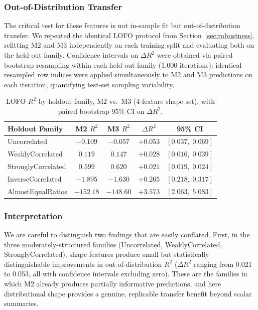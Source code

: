\documentclass[11pt,a4paper]{article}
\begin{document}
\subsubsection*{Out-of-Distribution Transfer}
The critical test for these features is not in-sample fit but out-of-distribution transfer. We repeated the identical LOFO protocol from Section~\ref{sec:robustness}, refitting M2 and M3 independently on each training split and evaluating both on the held-out family. Confidence intervals on $\Delta R^2$ were obtained via paired bootstrap resampling within each held-out family (1,000 iterations): identical resampled row indices were applied simultaneously to M2 and M3 predictions on each iteration, quantifying test-set sampling variability.

\begin{table}[h]
\centering
\caption{LOFO $R^2$ by holdout family, M2 vs.\ M3 (4-feature shape set), with paired bootstrap 95\% CI on $\Delta R^2$.}
\begin{tabular}{lcccc}
\hline
Holdout Family & M2 $R^2$ & M3 $R^2$ & $\Delta R^2$ & 95\% CI \\
\hline
Uncorrelated       & $-0.109$ & $-0.057$ & $+0.053$ & $[0.037,\;0.069]$ \\
WeaklyCorrelated   & $0.119$  & $0.147$  & $+0.028$ & $[0.016,\;0.039]$ \\
StronglyCorrelated & $0.599$  & $0.620$  & $+0.021$ & $[0.019,\;0.024]$ \\
InverseCorrelated  & $-1.895$ & $-1.630$ & $+0.265$ & $[0.218,\;0.317]$ \\
AlmostEqualRatios  & $-152.18$ & $-148.60$ & $+3.573$ & $[2.063,\;5.083]$ \\
\hline
\end{tabular}
\end{table}

\subsubsection*{Interpretation}
We are careful to distinguish two findings that are easily conflated. First, in the three moderately-structured families (Uncorrelated, WeaklyCorrelated, StronglyCorrelated), shape features produce small but statistically distinguishable improvements in out-of-distribution $R^2$ ($\Delta R^2$ ranging from 0.021 to 0.053, all with confidence intervals excluding zero). These are the families in which M2 already produces partially informative predictions, and here distributional shape provides a genuine, replicable transfer benefit beyond scalar summaries.
\end{document}
